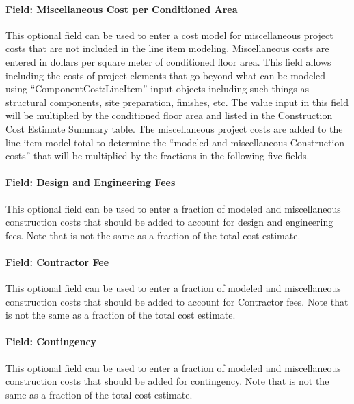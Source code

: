 \paragraph{Field: Miscellaneous Cost per Conditioned Area}\label{field-miscellaneous-cost-per-conditioned-area}

This optional field can be used to enter a cost model for miscellaneous project costs that are not included in the line item modeling. Miscellaneous costs are entered in dollars per square meter of conditioned floor area. This field allows including the costs of project elements that go beyond what can be modeled using ``ComponentCost:LineItem'' input objects including such things as structural components, site preparation, finishes, etc. The value input in this field will be multiplied by the conditioned floor area and listed in the Construction Cost Estimate Summary table. The miscellaneous project costs are added to the line item model total to determine the ``modeled and miscellaneous Construction costs'' that will be multiplied by the fractions in the following five fields.

\paragraph{Field: Design and Engineering Fees}\label{field-design-and-engineering-fees}

This optional field can be used to enter a fraction of modeled and miscellaneous construction costs that should be added to account for design and engineering fees. Note that is not the same as a fraction of the total cost estimate.

\paragraph{Field: Contractor Fee}\label{field-contractor-fee}

This optional field can be used to enter a fraction of modeled and miscellaneous construction costs that should be added to account for Contractor fees. Note that is not the same as a fraction of the total cost estimate.

\paragraph{Field: Contingency}\label{field-contingency}

This optional field can be used to enter a fraction of modeled and miscellaneous construction costs that should be added for contingency. Note that is not the same as a fraction of the total cost estimate.

